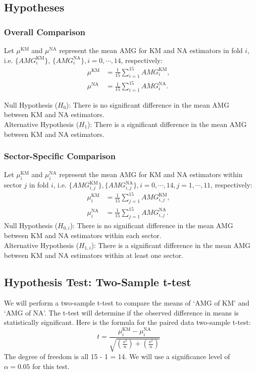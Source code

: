 \subsection{Hypotheses}
\subsubsection{Overall Comparison}
Let $\mu^{\text{KM}}$ and $\mu^{\text{NA}}$ represent the mean AMG for KM and NA estimators in fold $i$, i.e. $\{AMG^{\text{KM}}_i\}$, $\{AMG^{\text{NA}}_i\}, i = 0, \cdots, 14$, respectively:
\begin{align*}
    \mu^{\text{KM}}&= \frac{1}{15}\sum_{i=1}^{15} AMG^{\text{KM}}_i, \\
    \mu^{\text{NA}}&= \frac{1}{15}\sum_{i=1}^{15} AMG^{\text{NA}}_i.
\end{align*}

Null Hypothesis ($H_0$): There is no significant difference in the mean AMG between KM and NA estimators.\\
Alternative Hypothesis ($H_1$): There is a significant difference in the mean AMG between KM and NA estimators.

\subsubsection{Sector-Specific Comparison}
Let $\mu^{\text{KM}}_i$ and $\mu^{\text{NA}}_i$ represent the mean AMG for KM and NA estimators within sector $j$ in fold $i$, i.e. $\{AMG^{\text{KM}}_{i, j}\}, \{AMG^{\text{NA}}_{i, j}\}, i = 0, \cdots, 14, j = 1, \cdots, 11$, respectively:
\begin{align*}
    \mu^{\text{KM}}_i&= \frac{1}{15}\sum_{j=1}^{15} AMG^{\text{KM}}_{i, j}, \\
    \mu^{\text{NA}}_i&= \frac{1}{15}\sum_{j=1}^{15} AMG^{\text{NA}}_{i, j}.
\end{align*}
Null Hypothesis ($H_{0, i}$): There is no significant difference in the mean AMG between KM and NA estimators within each sector.\\
Alternative Hypothesis ($H_{1, i}$): There is a significant difference in the mean AMG between KM and NA estimators within at least one sector.

\subsection{Hypothesis Test: Two-Sample t-test}
We will perform a two-sample t-test to compare the means of `AMG of KM' and `AMG of NA'. The t-test will determine if the observed difference in means is statistically significant. Here is the formula for the paired data two-sample t-test:
\[
    t = \frac{\mu^{\text{KM}}_i - \mu^{\text{NA}}_i}{\sqrt{\left(\frac{s^2}{n}\right) + \left(\frac{s^2}{n}\right)}}
\]
The degree of freedom is all 15 - 1 = 14. We will use a significance level of $\alpha = 0.05$ for this test.
